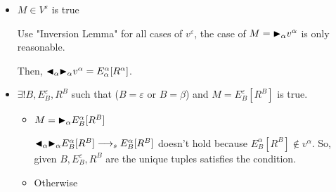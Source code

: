 \begin{itemize}
\begin{itemize}
	      	      \begin{itemize}
	      	      	\item $ M \in V^\varepsilon$ is true
	      	      	      	      	      	      	      	      	      	      	      	      	      	      	      	      	      	      		      	      	      	      	      	      	      	      	      	      	      	      
	      	      	      Use "Inversion Lemma" for all cases of $v^\varepsilon$, the case of $ M = {\mathop{\blacktriangleright}}_\alpha v^\alpha $ is only reasonable.
	      	      	      	      	      	      	      	      	      	      	      	      	      	      	      	      	      	      		      	      	      	      	      	      	      	      	      	      	      	      
	      	      	      Then, ${\mathop{\blacktriangleleft}}_\alpha {\mathop{\blacktriangleright}}_\alpha v^\alpha = E^\alpha_\alpha [R^\alpha]$.
	      	      	      	      	      	      	      	      	      	      	      	      	      	      	      	      	      	      		      	      	      	      	      	      	      	      	      	      	      	      
	      	      	\item $\exists ! B, E^\varepsilon_B, R^B$ such that ($B = \varepsilon$ or $B = \beta$) and $M = E^\varepsilon_B[R^B]$ is true.
	      	      	      	      	      	      	      	      	      	      	      	      	      	      	      	      	      	      		      	      	      	      	      	      	      	      	      	      	      	      
	      	      	      \begin{itemize}
	      	      	      	\item $ M = {\mathop{\blacktriangleright}}_\alpha E^\alpha_B[R^B] $
	      	      	      	      	      	      	      	      	      	      	      	      	      	      	      	      	      	      	      	      	      	      	      	      		      	      	      	      	      	      	      	      	      	      	      	      	      	      	      	      
	      	      	      	      $ {\mathop{\blacktriangleleft}}_\alpha {\mathop{\blacktriangleright}}_\alpha E^\alpha_B[R^B] \longrightarrow_s E^\alpha_B[R^B]$ doesn't hold because $ E^\alpha_B[R^B] \notin v^\alpha$.
	      	      	      	      So, given $B, E^\varepsilon_B, R^B$ are the unique tuples satisfies the condition.
	      	      	      	\item Otherwise
	      	      	      	      	      	      	      	      	      	      	      	      	      	      	      	      	      	      	      	      	      	      	      	      		      	      	      	      	      	      	      	      	      	      	      	      	      	      	      	      

\end{itemize}
\end{itemize}
\end{itemize}
\end{itemize}
